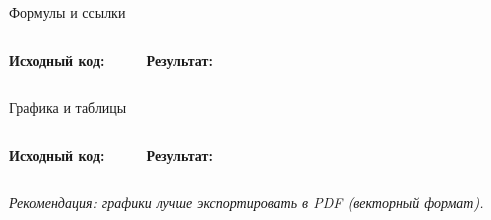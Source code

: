 \begin{frame}[fragile,label=formulas]{Формулы и ссылки}
  \begin{columns}[T,onlytextwidth]
      \textbf{Исходный код:}
      \vspace{0.2em}
      \inputminted[fontsize=\scriptsize, frame=single, breaklines=true]{latex}{examples/formula.tex}

      \textbf{Результат:}
      \vspace{0.2em}
      
      
  \end{columns}
\end{frame}

\begin{frame}[fragile,label=graphics]{Графика и таблицы}
  \begin{columns}[T,onlytextwidth]
      \textbf{Исходный код:}
      \vspace{0.2em}
      \inputminted[fontsize=\scriptsize, frame=single, breaklines=true]{latex}{examples/graphics.tex}

      \textbf{Результат:}
      \vspace{0.2em}
      
  \end{columns}
  
  \vspace{0.2em}
  \footnotesize \emph{Рекомендация: графики лучше экспортировать в PDF (векторный формат).}
\end{frame}